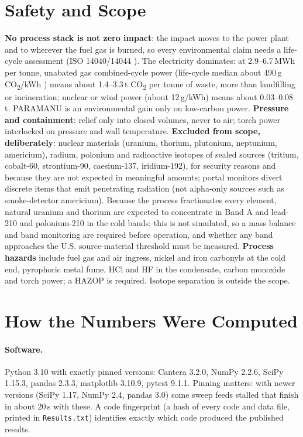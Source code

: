 \documentclass[11pt,a4paper]{article}
\begin{document}
\section{Safety and Scope}
\textbf{No process stack is not zero impact}: the impact moves to the power plant and to wherever the fuel gas is burned, so every environmental claim needs a life-cycle assessment (ISO 14040/14044 \citep{iso14040,iso14044}). The electricity dominates: at 2.9--6.7\,MWh per tonne, unabated gas combined-cycle power (life-cycle median about 490\,g CO\textsubscript{2}/kWh \citep{schlomer2014}) means about 1.4--3.3\,t CO\textsubscript{2} per tonne of waste, more than landfilling or incineration; nuclear or wind power (about 12\,g/kWh) means about 0.03--0.08\,t. PARAMANU is an environmental gain only on low-carbon power. \textbf{Pressure and containment}: relief only into closed volumes, never to air; torch power interlocked on pressure and wall temperature. \textbf{Excluded from scope, deliberately}: nuclear materials (uranium, thorium, plutonium, neptunium, americium), radium, polonium and radioactive isotopes of sealed sources (tritium, cobalt-60, strontium-90, caesium-137, iridium-192), for security reasons and because they are not expected in meaningful amounts; portal monitors divert discrete items that emit penetrating radiation (not alpha-only sources such as smoke-detector americium). Because the process fractionates every element, natural uranium and thorium are expected to concentrate in Band A and lead-210 and polonium-210 in the cold bands; this is not simulated, so a mass balance and band monitoring are required before operation, and whether any band approaches the U.S. source-material threshold \citep{nrc10cfr40} must be measured. \textbf{Process hazards} include fuel gas and air ingress, nickel and iron carbonyls at the cold end, pyrophoric metal fume, HCl and HF in the condensate, carbon monoxide and torch power; a HAZOP is required. Isotope separation is outside the scope.

\section{How the Numbers Were Computed}\label{ch:computing}
\paragraph{Software.} Python 3.10 with exactly pinned versions: Cantera 3.2.0, NumPy 2.2.6, SciPy 1.15.3, pandas 2.3.3, matplotlib 3.10.9, pytest 9.1.1. Pinning matters: with newer versions (SciPy 1.17, NumPy 2.4, pandas 3.0) some sweep feeds stalled that finish in about 20\,s with these. A code fingerprint (a hash of every code and data file, printed in \texttt{Results.txt}) identifies exactly which code produced the published results.
\end{document}
